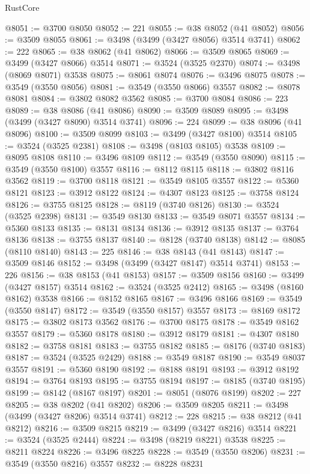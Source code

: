 \begin{lexlean}{RustCore}
\begin{coremodule}
@8051 := @3700 @8050
@8052 := 221
@8055 := @38 @8052 (@41 @8052)
@8056 := @3509 @8055
@8061 := @3498 (@3499 (@3427 @8056) @3514 @3741)
@8062 := 222
@8065 := @38 @8062 (@41 @8062)
@8066 := @3509 @8065
@8069 := @3499 (@3427 @8066) @3514
@8071 := @3524 (@3525 @2370)
@8074 := @3498 (@8069 @8071) @3538
@8075 := @8061 @8074
@8076 := @3496 @8075
@8078 := @3549 (@3550 @8056)
@8081 := @3549 (@3550 @8066) @3557
@8082 := @8078 @8081
@8084 := @3802 @8082 @3562
@8085 := @3700 @8084
@8086 := 223
@8089 := @38 @8086 (@41 @8086)
@8090 := @3509 @8089
@8095 := @3498 (@3499 (@3427 @8090) @3514 @3741)
@8096 := 224
@8099 := @38 @8096 (@41 @8096)
@8100 := @3509 @8099
@8103 := @3499 (@3427 @8100) @3514
@8105 := @3524 (@3525 @2381)
@8108 := @3498 (@8103 @8105) @3538
@8109 := @8095 @8108
@8110 := @3496 @8109
@8112 := @3549 (@3550 @8090)
@8115 := @3549 (@3550 @8100) @3557
@8116 := @8112 @8115
@8118 := @3802 @8116 @3562
@8119 := @3700 @8118
@8121 := @3549 @8105 @3557
@8122 := @5360 @8121
@8123 := @3912 @8122
@8124 := @4307 @8123
@8125 := @3758 @8124
@8126 := @3755 @8125
@8128 := @8119 (@3740 @8126)
@8130 := @3524 (@3525 @2398)
@8131 := @3549 @8130
@8133 := @3549 @8071 @3557
@8134 := @5360 @8133
@8135 := @8131 @8134
@8136 := @3912 @8135
@8137 := @3764 @8136
@8138 := @3755 @8137
@8140 := @8128 (@3740 @8138)
@8142 := @8085 (@8110 @8140)
@8143 := 225
@8146 := @38 @8143 (@41 @8143)
@8147 := @3509 @8146
@8152 := @3498 (@3499 (@3427 @8147) @3514 @3741)
@8153 := 226
@8156 := @38 @8153 (@41 @8153)
@8157 := @3509 @8156
@8160 := @3499 (@3427 @8157) @3514
@8162 := @3524 (@3525 @2412)
@8165 := @3498 (@8160 @8162) @3538
@8166 := @8152 @8165
@8167 := @3496 @8166
@8169 := @3549 (@3550 @8147)
@8172 := @3549 (@3550 @8157) @3557
@8173 := @8169 @8172
@8175 := @3802 @8173 @3562
@8176 := @3700 @8175
@8178 := @3549 @8162 @3557
@8179 := @5360 @8178
@8180 := @3912 @8179
@8181 := @4307 @8180
@8182 := @3758 @8181
@8183 := @3755 @8182
@8185 := @8176 (@3740 @8183)
@8187 := @3524 (@3525 @2429)
@8188 := @3549 @8187
@8190 := @3549 @8037 @3557
@8191 := @5360 @8190
@8192 := @8188 @8191
@8193 := @3912 @8192
@8194 := @3764 @8193
@8195 := @3755 @8194
@8197 := @8185 (@3740 @8195)
@8199 := @8142 (@8167 @8197)
@8201 := @8051 (@8076 @8199)
@8202 := 227
@8205 := @38 @8202 (@41 @8202)
@8206 := @3509 @8205
@8211 := @3498 (@3499 (@3427 @8206) @3514 @3741)
@8212 := 228
@8215 := @38 @8212 (@41 @8212)
@8216 := @3509 @8215
@8219 := @3499 (@3427 @8216) @3514
@8221 := @3524 (@3525 @2444)
@8224 := @3498 (@8219 @8221) @3538
@8225 := @8211 @8224
@8226 := @3496 @8225
@8228 := @3549 (@3550 @8206)
@8231 := @3549 (@3550 @8216) @3557
@8232 := @8228 @8231

\end{coremodule}
\end{lexlean}
